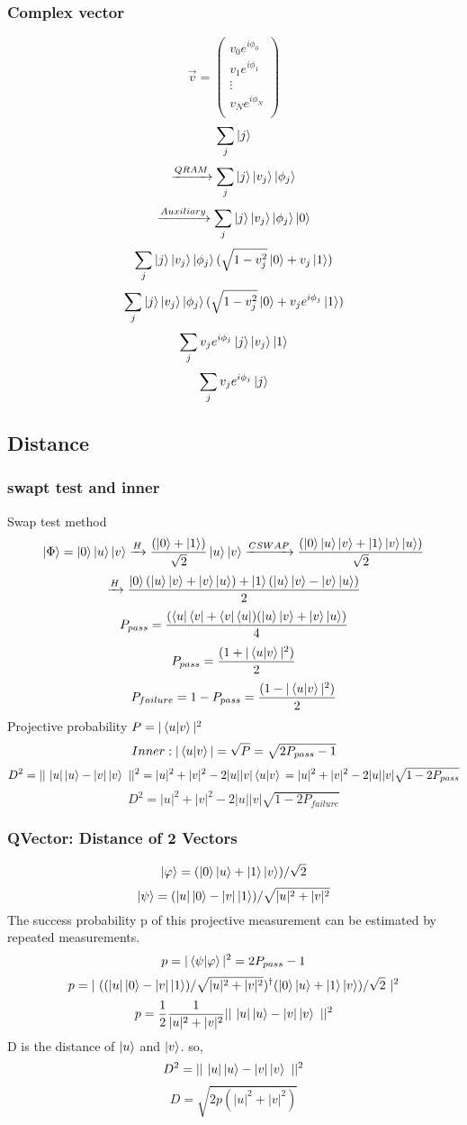 \documentclass{article}
\begin{document}
\subsubsection{ Complex vector}
$$ \vec{v} =\left(
\begin{array}{c}
v_0 e^{i\phi_0} \\
v_1 e^{i\phi_1} \\
\vdots \\
v_N e^{i\phi_N} \\
\end{array}
\right) $$
$$ \sum_j{ \ket{j} } $$
$$ \xrightarrow{QRAM}  \sum_j{\ket{j}\ket{v_j} \ket{\phi_j} } $$
$$ \xrightarrow{Auxiliary}  \sum_j{\ket{j}\ket{v_j} \ket{\phi_j} \ket{0} } $$
$$  \sum_j{\ket{j}\ket{v_j} \ket{\phi_j} ( \sqrt{1-v_j^2} \ket{0} + v_j\ket{1}) } $$
$$  \sum_j{\ket{j}\ket{v_j} \ket{\phi_j} ( \sqrt{1-v_j^2} \ket{0} + v_j e^{i\phi_j}\ket{1}) } $$
$$  \sum_j{v_j e^{i\phi_j} \ket{j}\ket{v_j}\ket{1} } $$
$$  \sum_j{v_j e^{i\phi_j} \ket{j} } $$

\subsection{Distance}
\subsubsection{swapt test and inner}
Swap test method
$$ \ket{\Phi} = \ket{0} \ket{u} \ket{v} \xrightarrow{H}  \frac{(\ket{0}+\ket{1})}{\sqrt{2} }\ket{u}\ket{v}  \xrightarrow{CSWAP}  \frac{(\ket{0}\ket{u}\ket{v}+\ket{1}	\ket{v}\ket{u})}{\sqrt{2}} \\ $$
$$\xrightarrow{H}  \frac{\ket{0}(\ket{u}\ket{v}+\ket{v}\ket{u})+\ket{1}(\ket{u}\ket{v}-\ket{v}\ket{u})}{2} $$
$$ P_{pass}=\frac{(\bra{u}\bra{v}+\bra{v}\bra{u}) (\ket{u}\ket{v}+\ket{v}\ket{u})}{4}$$
$$ P_{pass}=\frac{(1+|\braket{u|v}|^2)}{2}$$
$$ P_{failure}=1-P_{pass} = \frac{(1-|\braket{u|v}|^2)}{2}$$
 Projective probability $ P = |\braket{u|v}|^2 $
$$ Inner: |\braket{u|v}| = \sqrt{P} =\sqrt{ 2P_{pass} -1} $$
$$ D^{2}=||\ |u|\ket{u}-|v|\ket{v}\ ||^{2} = |u|^2+|v|^2-2|u||v| \braket{u|v}\\
 =|u|^2+|v|^2-2|u||v|\sqrt{1-2P_{pass}} $$
$$ D^2=|u|^2+|v|^2-2|u||v|\sqrt{1-2P_{failure}} $$

\subsubsection{ QVector: Distance of 2 Vectors}

\[  \ket{\varphi}=(\ket{0}\ket{u}+\ket{1}\ket{v})/\sqrt{2}
\]
\[  \ket{\psi}=(|u|\ket{0}-|v|\ket{1})/\sqrt{|u|^{2}+|v|^{2}}
\]
The success probability p of this projective measurement
can be estimated by repeated measurements.
\[  p=|\braket{\psi|\varphi}|^{2} = 2P_{pass}-1\]
\[
    p=|\   ((|u|\ket{0}-|v|\ket{1})/\sqrt{|u|^{2}+|v|^{2}})^{\dag}(\ket{0}\ket{u}+\ket{1}\ket{v})/\sqrt{2}\ |^{2}
\]
$$ p=\frac{1}{2}\frac{1}{|u|^{2}+|v|^{2}}||\ |u|\ket{u}-|v|\ket{v}\ ||^{2} $$
D is the distance of $\ket{u}$ and $\ket{v}$. so,\\
$$ D^{2}=||\ |u|\ket{u}-|v|\ket{v}\ ||^{2} $$
$$ D=\sqrt{2p(|u|^{2}+|v|^{2})} $$
\end{document}
